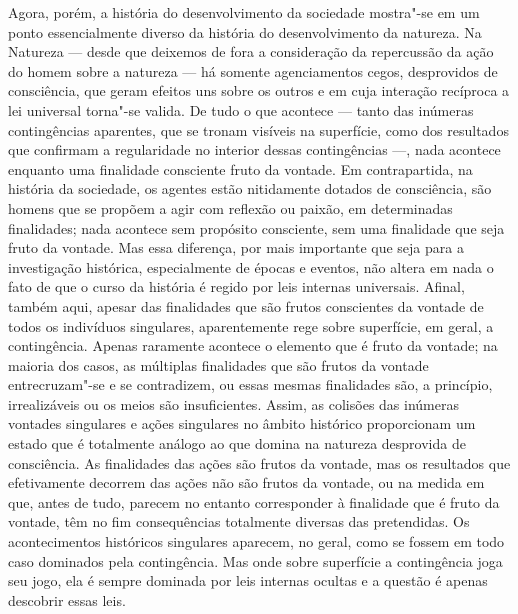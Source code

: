 Agora, porém, a história do desenvolvimento da sociedade mostra"-se
em um ponto essencialmente diverso da história do desenvolvimento da
natureza. Na Natureza --- desde que deixemos de fora a consideração da
repercussão da ação do homem sobre a natureza --- há 
somente agenciamentos cegos, desprovidos de consciência, que geram
efeitos uns sobre os outros e em cuja interação recíproca a lei
universal torna"-se valida. De tudo o que acontece --- tanto das inúmeras
contingências aparentes, que se tronam visíveis na superfície, como dos
resultados que confirmam a regularidade no 
interior dessas contingências ---, nada acontece enquanto uma finalidade
consciente fruto da vontade. Em contrapartida, na história da sociedade,
os agentes estão nitidamente dotados de consciência, são homens que se
propõem a agir com reflexão ou paixão, em determinadas finalidades; nada
acontece sem propósito consciente, sem uma finalidade que seja fruto da
vontade. Mas essa diferença, por mais importante que seja para a
investigação histórica, especialmente de épocas e eventos, não altera em
nada o fato de que o curso da história é regido por leis internas
universais. Afinal, também aqui, apesar das finalidades que são frutos
conscientes da vontade de todos os indivíduos singulares, aparentemente
rege sobre superfície, em geral, a contingência. Apenas raramente
acontece o elemento que é fruto da vontade; na maioria dos casos, as
múltiplas finalidades que são frutos da vontade entrecruzam"-se e se
contradizem, ou essas mesmas finalidades são, a princípio, irrealizáveis
ou os meios são insuficientes. Assim, as colisões das inúmeras vontades
singulares e ações singulares no âmbito histórico proporcionam um estado
que é totalmente análogo ao que domina na natureza desprovida de
consciência. As finalidades das ações são frutos da vontade, mas os
resultados que efetivamente decorrem das ações não são frutos da vontade,
ou na medida em que, antes de tudo, parecem no entanto corresponder à
finalidade que é fruto da vontade, têm no fim consequências totalmente
diversas das pretendidas. Os acontecimentos históricos singulares aparecem,
no geral, como se fossem em todo caso dominados pela
contingência. Mas onde sobre superfície a contingência joga seu jogo,
ela é sempre dominada por leis internas ocultas e a questão é apenas
descobrir essas leis.

